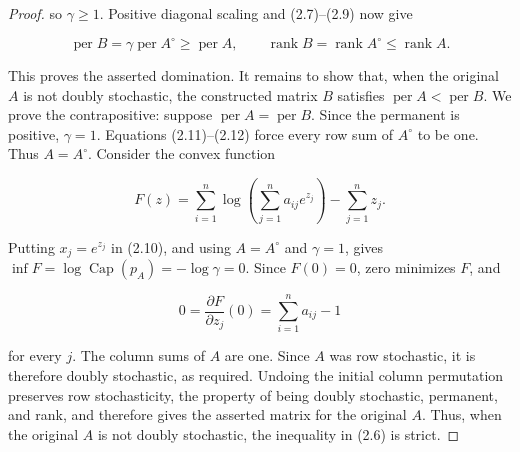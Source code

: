 \documentclass[10pt,a4paper]{amsart}
\begin{document}
\begin{proof}
so \(\gamma\geq1\). Positive diagonal scaling and (2.7)--(2.9) now give

\[
 \operatorname{per}B
 =\gamma\operatorname{per}A^\circ
 \geq\operatorname{per}A,
 \qquad
 \operatorname{rank}B=\operatorname{rank}A^\circ
 \leq\operatorname{rank}A.                                \tag{2.13}
\]

This proves the asserted domination. It remains to show that, when the
original \(A\) is not doubly stochastic, the constructed matrix \(B\)
satisfies \(\operatorname{per}A<\operatorname{per}B\). We prove the
contrapositive: suppose \(\operatorname{per}A=\operatorname{per}B\). Since
the permanent is positive, \(\gamma=1\). Equations (2.11)--(2.12) force
every row sum of \(A^\circ\)
to be one. Thus \(A=A^\circ\). Consider the convex function

\[
 F(z)=\sum_{i=1}^n
 \log\!\left(\sum_{j=1}^n a_{ij}e^{z_j}\right)
 -\sum_{j=1}^n z_j.                                       \tag{2.14}
\]

Putting \(x_j=e^{z_j}\) in (2.10), and using \(A=A^\circ\) and \(\gamma=1\),
gives \(\inf F=\log\operatorname{Cap}(p_A)=-\log\gamma=0\). Since
\(F(0)=0\), zero minimizes \(F\), and

\nopagebreak[4]
\[
 0=\frac{\partial F}{\partial z_j}(0)
 =\sum_{i=1}^n a_{ij}-1                                   \tag{2.15}
\]

for every \(j\). The column sums of \(A\) are one. Since \(A\) was row
stochastic, it is therefore doubly stochastic, as required. Undoing the
initial column permutation preserves row stochasticity, the property of
being doubly stochastic, permanent, and rank, and therefore gives the
asserted matrix for the original \(A\). Thus, when the original \(A\) is not
doubly stochastic, the inequality in (2.6) is strict.
\end{proof}
\end{document}
